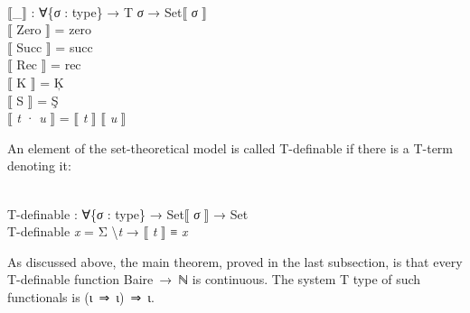 \documentclass{entcs} \usepackage{prentcsmacro}
\newcommand{\AgdaC}[1]{\mbox{#1}}
\newcommand{\AgdaFontStyle}[1]{\textsf{#1}}
\newcommand{\AgdaBoundFontStyle}[1]{\textit{#1}}
\newcommand{\AgdaSymbol}      [1]{\textcolor{AgdaSymbol}{#1}}
\newcommand{\AgdaPrimitiveType}[1]
    {\AgdaFontStyle{\textcolor{AgdaPrimitiveType}{#1}}}
\newcommand{\AgdaBound}    [1]{\AgdaBoundFontStyle{\textcolor{AgdaBound}{#1}}}
\newcommand{\AgdaInductiveConstructor}[1]
    {\AgdaFontStyle{\textcolor{AgdaInductiveConstructor}{#1}}}
\newcommand{\AgdaDatatype} [1]{\AgdaFontStyle{\textcolor{AgdaDatatype}{#1}}}
\newcommand{\AgdaFunction} [1]{\AgdaFontStyle{\textcolor{AgdaFunction}{#1}}}
\newcommand{\AgdaCodeStyle}{\small}
\newenvironment{code}%
{\noindent\AgdaCodeStyle\pboxed}%
{\endpboxed\par\noindent%
\ignorespacesafterend}
\begin{document}
\begin{code}\>\<%
\\
\>\AgdaFunction{⟦\_⟧} \AgdaSymbol{:} \AgdaSymbol{∀\{}\AgdaBound{σ} \AgdaSymbol{:} \AgdaDatatype{type}\AgdaSymbol{\}} \AgdaSymbol{→} \AgdaDatatype{T} \AgdaBound{σ} \AgdaSymbol{→} \AgdaFunction{Set⟦} \AgdaBound{σ} \AgdaFunction{⟧}\<%
\\
\>\AgdaFunction{⟦} \AgdaInductiveConstructor{Zero} \AgdaFunction{⟧} \<[10]%
\>[10]\AgdaSymbol{=} \AgdaInductiveConstructor{zero}\<%
\\
\>\AgdaFunction{⟦} \AgdaInductiveConstructor{Succ} \AgdaFunction{⟧} \<[10]%
\>[10]\AgdaSymbol{=} \AgdaInductiveConstructor{succ}\<%
\\
\>\AgdaFunction{⟦} \AgdaInductiveConstructor{Rec} \AgdaFunction{⟧} \<[10]%
\>[10]\AgdaSymbol{=} \AgdaFunction{rec}\<%
\\
\>\AgdaFunction{⟦} \AgdaInductiveConstructor{K} \AgdaFunction{⟧} \<[10]%
\>[10]\AgdaSymbol{=} \AgdaFunction{Ķ}\<%
\\
\>\AgdaFunction{⟦} \AgdaInductiveConstructor{S} \AgdaFunction{⟧} \<[10]%
\>[10]\AgdaSymbol{=} \AgdaFunction{Ş}\<%
\\
\>\AgdaFunction{⟦} \AgdaBound{t} \AgdaInductiveConstructor{·} \AgdaBound{u} \AgdaFunction{⟧} \<[12]%
\>[12]\AgdaSymbol{=} \AgdaFunction{⟦} \AgdaBound{t} \AgdaFunction{⟧} \AgdaFunction{⟦} \AgdaBound{u} \AgdaFunction{⟧} \<[26]%
\>[26]\<%
\\
\>\<\end{code}
An element of the set-theoretical model is called T-definable if
there is a T-term denoting it:

\begin{code}\>\<%
\\
\>\AgdaFunction{T-definable} \AgdaSymbol{:} \AgdaSymbol{∀\{}\AgdaBound{σ} \AgdaSymbol{:} \AgdaDatatype{type}\AgdaSymbol{\}} \AgdaSymbol{→} \AgdaFunction{Set⟦} \AgdaBound{σ} \AgdaFunction{⟧} \AgdaSymbol{→} \AgdaPrimitiveType{Set}\<%
\\
\>\AgdaFunction{T-definable} \AgdaBound{x} \AgdaSymbol{=} \AgdaDatatype{Σ} \AgdaSymbol{	\textbackslash}\AgdaBound{t} \AgdaSymbol{→} \AgdaFunction{⟦} \AgdaBound{t} \AgdaFunction{⟧} \AgdaDatatype{≡} \AgdaBound{x}\<%
\\
\>\<\end{code}
As discussed above, the main theorem, proved in the last subsection, is
that every \AgdaC{T}-definable function \AgdaC{Baire → ℕ} is
continuous. The system \AgdaC{T} type of such functionals is \AgdaC{(ι
⇒ ι) ⇒ ι}.  
\end{document}
